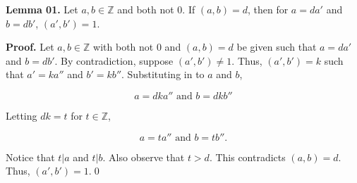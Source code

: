 \documentclass[12pt]{article}
\begin{document}
\noindent\textbf{Lemma 01.} Let $a,b\in\mathbb{Z}$ and both not 0. If $(a,b)=d$, then for $a=da'$ and $b=db'$, $(a',b')=1$.

\bigskip

\noindent\textbf{Proof.} Let $a,b\in\mathbb{Z}$ with both not 0 and $(a,b)=d$ be given such that $a=da'$ and $b=db'$. By contradiction, suppose $(a',b')\not= 1$. Thus, $(a',b')=k$ such that $a'=ka''$ and $b'=kb''$. Substituting in to $a$ and $b$, 

\begin{equation*}
a=dka'' \text{ and } b=dkb''
\end{equation*}

\noindent Letting $dk=t$ for $t\in\mathbb{Z}$,

\begin{equation*}
a=ta'' \text{ and } b=tb''.
\end{equation*}

\noindent Notice that $t|a$ and $t|b$. Also observe that $t>d$. This contradicts $(a,b)=d$. Thus, $(a',b')=1$.\qed
\end{document}
